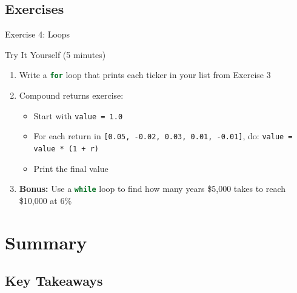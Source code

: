 \documentclass[9pt,aspectratio=169]{beamer}
\newcommand{\py}[1]{\lstinline[language=Python]{#1}}
\begin{document}
\subsection{Exercises}
\begin{frame}[fragile]{Exercise 4: Loops}

\begin{alertblock}{Try It Yourself (5 minutes)}
\begin{enumerate}
    \item Write a \py{for} loop that prints each ticker in your list from Exercise 3
    \item Compound returns exercise:
    \begin{itemize}
        \item Start with \texttt{value = 1.0}
        \item For each return in \texttt{[0.05, -0.02, 0.03, 0.01, -0.01]}, do: \texttt{value = value * (1 + r)}
        \item Print the final value
    \end{itemize}
    \item \textbf{Bonus:} Use a \py{while} loop to find how many years \$5,000 takes to reach \$10,000 at 6\%
\end{enumerate}
\end{alertblock}

\end{frame}


\section{Summary}
\subsection{Key Takeaways}
\end{document}
